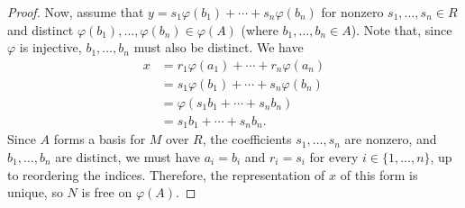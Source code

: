 \documentclass[10pt]{article}
\begin{document}
\begin{enumerate}
\begin{proof}
Now, assume that $y = s_1\varphi(b_1) + \cdots + s_n\varphi(b_n)$ for nonzero $s_1, \dots , s_n \in R$ and distinct $\varphi(b_1), \dots , \varphi(b_n) \in \varphi(A)$ (where $b_1, \dots , b_n \in A$).  Note that, since $\varphi$ is injective, $b_1, \dots , b_n$ must also be distinct.  We have
\begin{align*}
x &= r_1\varphi(a_1) + \cdots + r_n\varphi(a_n)
\\
&= s_1\varphi(b_1) + \cdots + s_n\varphi(b_n)
\\
&= \varphi(s_1b_1 + \cdots + s_nb_n)
\\
&= s_1b_1 + \cdots + s_nb_n.
\end{align*}
Since $A$ forms a basis for $M$ over $R$, the coefficients $s_1, \dots, s_n$ are nonzero, and $b_1, \dots , b_n$ are distinct, we must have $a_i = b_i$ and $r_i = s_i$ for every $i \in \{1, \dots , n \}$, up to reordering the indices.  Therefore, the representation of $x$ of this form is unique, so $N$ is free on $\varphi(A)$.




\begin{comment}
Let $I$ be a nonempty index set and for each $i \in I$ let $M_i$ be an $R$-module freely generated by $A_i$ over $R$.  Let $M = \oplus_{i \in I} M_i$.  Let $\overline{M_i}$ be the natural inclusion of $M_i$ into $M$ under the inclusion map $\iota: M_i \rightarrow M$.  Since $\iota$ is an injective homomorphism, it is an isomorphism of $M_i$ onto its image $\overline{M_i}$.  So every element $\overline{m_i} \in \overline{M_i}$ has a unique representation as
$$
\overline{m_i} = \iota(r_1a_1 + \cdots + r_na_n) = r_1 \iota(a_1) + \cdots + r_n \iota(a_n).
$$
Therefore, $\overline{A_i} = \iota(A_i)$ forms a basis for $\overline{M_i}$ over $R$.  So $\overline{M_i}$ is freely generated by $\overline{A_i}$ over $R$.

The direct sum $M$ is equal to the set of all finite sums $x_1 + \cdots + x_n$ where $x_k \in M_{i_k}$ for some $i_k \in I$.  Furthermore, every element of $M$ has a unique representation of this form.  Also, each $x_k$ has a unique representation of the form
\end{comment}
\begin{comment}
First, we need to make a technical construction.  By the definition in exercise 20, we cannot necessarily assume the $M_i$ are submodules of some larger module, since the book has defined the direct sum to be the restriced direct product with the action of $R$ defined componentwise.  First, for each $i$, we will embed the basis of $M_i$ into $M$ and show that this embedding yields a basis for the inclusion of $M_i$ into the $M$.  The union of these embedded bases will then be a basis for $M$.


\end{comment}
\end{proof}
\end{enumerate}
\end{document}
